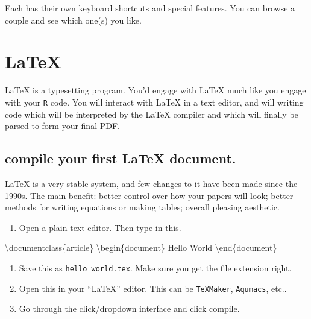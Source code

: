\documentclass[]{book}
\newenvironment{Shaded}{\begin{snugshade}}{\end{snugshade}}
\newcommand{\DataTypeTok}[1]{\textcolor[rgb]{0.13,0.29,0.53}{#1}}
\newcommand{\ExtensionTok}[1]{#1}
\newcommand{\NormalTok}[1]{#1}
\providecommand{\tightlist}{%
  \setlength{\itemsep}{0pt}\setlength{\parskip}{0pt}}
\theoremstyle{definition}
\theoremstyle{definition}
\theoremstyle{definition}
\theoremstyle{remark}
\begin{document}
Each has their own keyboard shortcuts and special features. You can
browse a couple and see which one(s) you like.

\section{LaTeX}\label{latex}

LaTeX is a typesetting program. You'd engage with LaTeX much like you
engage with your \texttt{R} code. You will interact with LaTeX in a text
editor, and will writing code which will be interpreted by the LaTeX
compiler and which will finally be parsed to form your final PDF.

\subsection{compile your first LaTeX
document.}\label{compile-your-first-latex-document.}

LaTeX is a very stable system, and few changes to it have been made
since the 1990s. The main benefit: better control over how your papers
will look; better methods for writing equations or making tables;
overall pleasing aesthetic.

\begin{enumerate}
\def\labelenumi{\arabic{enumi}.}
\tightlist
\item
  Open a plain text editor. Then type in this.
\end{enumerate}

\begin{Shaded}
\begin{Highlighting}[]
\NormalTok{\textbackslash{}}\ExtensionTok{documentclass}\DataTypeTok{\{article\}}
\NormalTok{\textbackslash{}}\ExtensionTok{begin}\DataTypeTok{\{document\}}
\ExtensionTok{Hello}\NormalTok{ World}
\NormalTok{\textbackslash{}}\ExtensionTok{end}\DataTypeTok{\{document\}}
\end{Highlighting}
\end{Shaded}

\begin{enumerate}
\def\labelenumi{\arabic{enumi}.}
\setcounter{enumi}{1}
\tightlist
\item
  Save this as \texttt{hello\_world.tex}. Make sure you get the file
  extension right.
\item
  Open this in your ``LaTeX'' editor. This can be \texttt{TeXMaker},
  \texttt{Aqumacs}, etc..
\item
  Go through the click/dropdown interface and click compile.
\end{enumerate}
\end{document}
